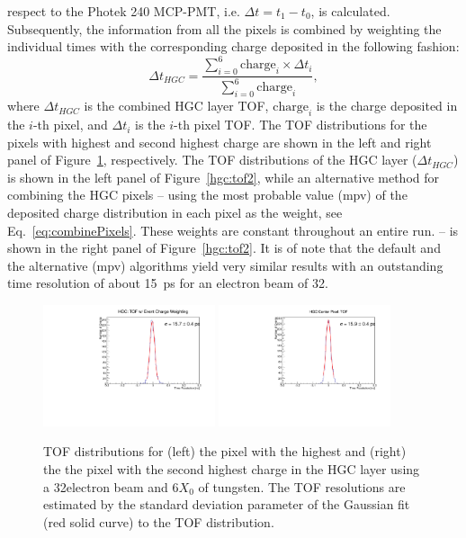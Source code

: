 respect to the Photek 240 MCP-PMT, i.e. $\Delta t = t_{1}-t_{0}$, is
calculated. Subsequently, the information from all the pixels is
combined by weighting the individual times with the corresponding
charge deposited in the following fashion:
\begin{equation}\label{eq:combinePixels}
\Delta t_{HGC} = \frac{\sum\limits_{i=0}^{6}\mathrm{charge}_{i}\times\Delta t_{i}}{\sum\limits_{i=0}^{6}\mathrm{charge}_{i}},
\end{equation}
where $\Delta t_{HGC}$ is the combined HGC layer TOF, $\mathrm{charge}_{i}$ is
the charge deposited in the $i$-th pixel, and $\Delta t_{i}$ is the 
 $i$-th pixel TOF. The TOF distributions for the pixels with highest
 and second highest charge are shown in the left and right panel of
 Figure~\ref{hgc:tof1}, respectively.
 The TOF distributions of the HGC layer ($\Delta
 t_{HGC}$) is shown in the left panel of
 Figure~\ref{hgc:tof2}, while an alternative method for combining the
 HGC pixels --
 using the most probable value (mpv) of the deposited charge distribution in each pixel
 as the weight, see Eq.~\ref{eq:combinePixels}. These weights are
 constant throughout an entire run.  -- is shown in the right panel of
 Figure~\ref{hgc:tof2}. It is of note that the default and the
 alternative (mpv) algorithms yield very similar results with an
 outstanding time resolution of about 15~ps for an electron beam of 32\GeV.
  
\begin{figure}[h] 
\centering
\includegraphics[width=0.45\textwidth]{HGC/deltaTPicoSilEventCharge104.pdf} 
\includegraphics[width=0.45\textwidth]{HGC/deltaTCenter104.pdf} 
\caption{TOF distributions for (left) the pixel with the highest and (right) the
  the pixel with the second highest charge in the HGC layer using a
  32\GeV electron beam and 6$X_{0}$ of tungsten. The TOF resolutions are estimated by the
standard deviation parameter of the Gaussian fit (red solid curve) to the TOF distribution.} 
\label{hgc:tof1} 
\end{figure}

